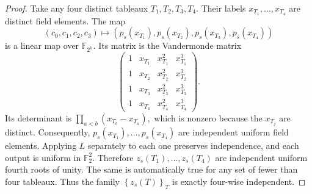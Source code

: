 \documentclass[10pt,twocolumn,superscriptaddress,aps,amsmath,amssymb,citeautoscript,floatfix,prx]{revtex4-2}
\theoremstyle{plain}
\theoremstyle{plain}
\theoremstyle{plain}
\theoremstyle{plain}
\theoremstyle{plain}
\theoremstyle{plain}
\theoremstyle{plain}
\theoremstyle{definition}
\theoremstyle{plain}
\begin{document}
\begin{appendix}
\begin{proof}
Take any four distinct tableaux
$
T_1, T_2, T_3, T_4 .
$
Their labels
$
x_{T_1}, \ldots, x_{T_4}
$
are distinct field elements.
The map
$$
\left(c_0, c_1, c_2, c_3\right) \longmapsto\left(p_s\left(x_{T_1}\right), p_s\left(x_{T_2}\right), p_s\left(x_{T_3}\right), p_s\left(x_{T_4}\right)\right)
$$
is a linear map over $\mathbb{F}_{2^h}$. Its matrix is the Vandermonde matrix
$$
\left(\begin{array}{cccc}
1 & x_{T_1} & x_{T_1}^2 & x_{T_1}^3 \\
1 & x_{T_2} & x_{T_2}^2 & x_{T_2}^3 \\
1 & x_{T_3} & x_{T_3}^2 & x_{T_3}^3 \\
1 & x_{T_4} & x_{T_4}^2 & x_{T_4}^3
\end{array}\right) .
$$
Its determinant is
$
\prod_{a<b}\left(x_{T_b}-x_{T_a}\right),
$
which is nonzero because the $x_{T_j}$ are distinct.
Consequently,
$
p_s\left(x_{T_1}\right), \ldots, p_s\left(x_{T_4}\right)
$
are independent uniform field elements.
Applying $L$ separately to each one preserves independence, and each output is uniform in $\mathbb{F}_2^2$. Therefore
$
z_s\left(T_1\right), \ldots, z_s\left(T_4\right)
$
are independent uniform fourth roots of unity.
The same is automatically true for any set of fewer than four tableaux.
Thus the family
$
\left\{z_s(T)\right\}_T
$
is exactly four-wise independent.


\end{proof}
\end{appendix}
\end{document}
